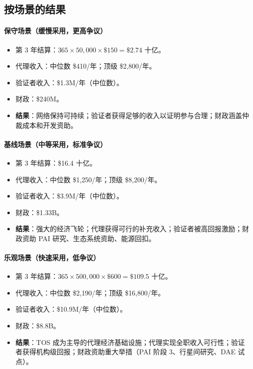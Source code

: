 \documentclass[11pt]{article}
\begin{document}
\subsection{按场景的结果}
\paragraph{保守场景（缓慢采用，更高争议）}
\begin{itemize}[noitemsep]
  \item 第 3 年结算：$365 \times 50{,}000 \times \$150 = \$2.74$ 十亿。
  \item 代理收入：中位数 \$410/年；顶级 \$2{,}800/年。
  \item 验证者收入：\$1.3M/年（中位数）。
  \item 财政：\$240M。
  \item \textbf{结果}：网络保持可持续；验证者获得足够的收入以证明参与合理；财政涵盖仲裁成本和开发资助。
\end{itemize}

\paragraph{基线场景（中等采用，标准争议）}
\begin{itemize}[noitemsep]
  \item 第 3 年结算：\$16.4 十亿。
  \item 代理收入：中位数 \$1{,}250/年；顶级 \$8{,}200/年。
  \item 验证者收入：\$3.9M/年（中位数）。
  \item 财政：\$1.33B。
  \item \textbf{结果}：强大的经济飞轮；代理获得可行的补充收入；验证者被高回报激励；财政资助 PAI 研究、生态系统资助、能源回扣。
\end{itemize}

\paragraph{乐观场景（快速采用，低争议）}
\begin{itemize}[noitemsep]
  \item 第 3 年结算：$365 \times 500{,}000 \times \$600 = \$109.5$ 十亿。
  \item 代理收入：中位数 \$2{,}190/年；顶级 \$16{,}800/年。
  \item 验证者收入：\$10.9M/年（中位数）。
  \item 财政：\$8.8B。
  \item \textbf{结果}：TOS 成为主导的代理经济基础设施；代理实现全职收入可行性；验证者获得机构级回报；财政资助重大举措（PAI 阶段 3、行星间研究、DAE 试点）。
\end{itemize}
\end{document}
